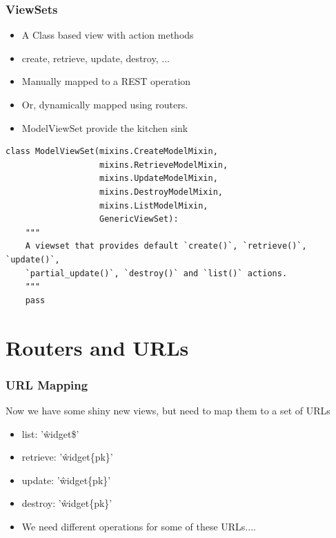 \documentclass{beamer}
\begin{document}
\begin{frame}[fragile]

  \frametitle{ViewSets}

  \begin{itemize}
  	\item A Class based view with action methods
	\item create, retrieve, update, destroy, ...
	\item Manually mapped to a REST operation
	\item Or, dynamically mapped using routers.
	\item ModelViewSet provide the kitchen sink
  \end{itemize}
 
\begin{lstlisting}
class ModelViewSet(mixins.CreateModelMixin,
                   mixins.RetrieveModelMixin,
                   mixins.UpdateModelMixin,
                   mixins.DestroyModelMixin,
                   mixins.ListModelMixin,
                   GenericViewSet):
    """
    A viewset that provides default `create()`, `retrieve()`, `update()`,
    `partial_update()`, `destroy()` and `list()` actions.
    """
    pass

\end{lstlisting}
  
\end{frame}

\section{Routers and URLs}
\begin{frame}[fragile]

  \frametitle{URL Mapping}

	Now we have some shiny new views, but need to map them to a set of URLs
  \begin{itemize}
  \item list: '\^widget\/\$'
  \item retrieve: '\^widget\/\{pk\}\/'
  \item update: '\^widget\/\{pk\}\/'
  \item destroy: '\^widget\/\{pk\}\/'
  \item We need different operations for some of these URLs....
  \end{itemize}
  
\end{frame}
\end{document}
